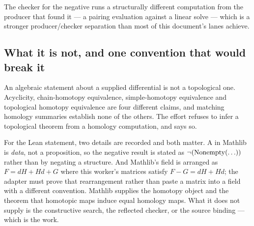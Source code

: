 The checker for the negative runs a structurally different computation from the
producer that found it --- a pairing evaluation against a linear solve --- which
is a stronger producer/checker separation than most of this document's lanes
achieve.

\subsection{What it is not, and one convention that would break it}

An algebraic statement about a supplied differential is not a topological one.
Acyclicity, chain-homotopy equivalence, simple-homotopy equivalence and
topological homotopy equivalence are four different claims, and matching
homology summaries establish none of the others. The effort refuses to infer a
topological theorem from a homology computation, and says so.

For the Lean statement, two details are recorded and both matter. A
 in Mathlib is \emph{data}, not a proposition, so the negative
result is stated as $\neg(\operatorname{Nonempty}(\ldots))$ rather than by negating a
structure. And Mathlib's  field is arranged as $F=dH+Hd+G$ where
this worker's matrices satisfy $F-G=dH+Hd$; the adapter must prove that
rearrangement rather than paste a matrix into a field with a different
convention. Mathlib supplies the homotopy object and the theorem that homotopic
maps induce equal homology maps. What it does not supply is the constructive
search, the reflected checker, or the source binding --- which is the work.
